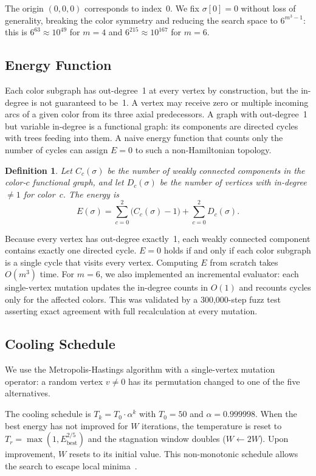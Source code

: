 \documentclass[11pt]{article}
\theoremstyle{plain}
\newtheorem{definition}{Definition}
\begin{document}
The origin $(0,0,0)$ corresponds to index~0. We fix $\sigma[0] = 0$
without loss of generality, breaking the color symmetry and reducing the
search space to $6^{m^3-1}$: this is $6^{63} \approx 10^{49}$ for
$m=4$ and $6^{215} \approx 10^{167}$ for $m=6$.

\subsection{Energy Function}

Each color subgraph has out-degree~1 at every vertex by construction, but
the in-degree is not guaranteed to be~1. A vertex may receive zero or
multiple incoming arcs of a given color from its three axial predecessors.
A graph with out-degree~1 but variable in-degree is a functional graph:
its components are directed cycles with trees feeding into them. A naive
energy function that counts only the number of cycles can assign $E = 0$
to such a non-Hamiltonian topology.

\begin{definition}
Let $C_c(\sigma)$ be the number of weakly connected components in the
color-$c$ functional graph, and let $D_c(\sigma)$ be the number of vertices
with in-degree $\ne 1$ for color~$c$. The energy is
\[
  E(\sigma) = \sum_{c=0}^{2} \bigl(C_c(\sigma) - 1\bigr)
            + \sum_{c=0}^{2} D_c(\sigma).
\]
\end{definition}

Because every vertex has out-degree exactly~1, each weakly connected
component contains exactly one directed cycle. $E = 0$ holds if and only
if each color subgraph is a single cycle that visits every vertex. Computing $E$ from scratch takes $O(m^3)$ time. For $m=6$,
we also implemented an incremental evaluator: each single-vertex mutation
updates the in-degree counts in $O(1)$ and recounts cycles only for the
affected colors. This was validated by a 300{,}000-step fuzz test asserting
exact agreement with full recalculation at every mutation.

\subsection{Cooling Schedule}

We use the Metropolis-Hastings algorithm with a single-vertex mutation
operator: a random vertex $v \ne 0$ has its permutation changed to one of
the five alternatives.

The cooling schedule is $T_k = T_0 \cdot \alpha^k$ with $T_0 = 50$ and
$\alpha = 0.999998$. When the best energy has not improved for $W$
iterations, the temperature is reset to
$T_r = \max(1, E_{\text{best}}^{2/5})$ and the stagnation window doubles
($W \leftarrow 2W$). Upon improvement, $W$ resets to its initial value.
This non-monotonic schedule allows the search to escape local
minima~\cite{kirkpatrick1983,marinari1992}.
\end{document}
